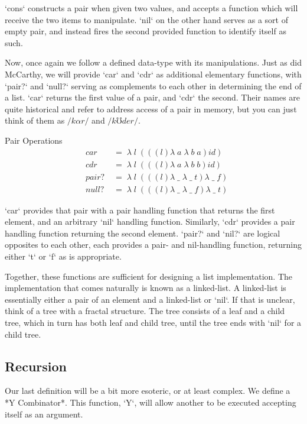 \documentclass[11pt]{article}
\begin{document}
`cons` constructs a pair when given two values, and accepts a function which will receive the two items to manipulate. `nil` on the other hand serves as a sort of empty pair, and instead fires the second provided function to identify itself as such.

Now, once again we follow a defined data-type with its manipulations. Just as did McCarthy, we will provide `car` and `cdr` as additional elementary functions, with `pair?` and `null?` serving as complements to each other in determining the end of a list. `car` returns the first value of a pair, and `cdr` the second. Their names are quite historical and refer to address access of a pair in memory, but you can just think of them as $/k \alpha r/$ and $/k \mho d e r/$.

Pair Operations
\begin{align*}
& car \; &= \; \lambda \; l \; (((l)\lambda \; a \; \lambda \; b \; a)id)
\\& cdr \; &= \; \lambda \; l \; (((l)\lambda \; a \; \lambda \; b \; b)id)
\\& pair? \; &= \; \lambda \; l \; (((l)\lambda \; \_ \; \lambda \; \_ \; t)\lambda \; \_ \; f)
\\& null? \; &= \; \lambda \; l \; (((l)\lambda \; \_ \; \lambda \; \_ \; f)\lambda \; \_ \; t)
\end{align*}

`car` provides that pair with a pair handling function that returns the first element, and an arbitrary `nil` handling function. Similarly, `cdr` provides a pair handling function returning the second element. `pair?` and `nil?` are logical opposites to each other, each provides a pair- and nil-handling function, returning either `t` or `f` as is appropriate.

Together, these functions are sufficient for designing a list implementation. The implementation that comes naturally is known as a linked-list. A linked-list is essentially either a pair of an element and a linked-list or `nil`. If that is unclear, think of a tree with a fractal structure. The tree consists of a leaf and a child tree, which in turn has both leaf and child tree, until the tree ends with `nil` for a child tree.

\subsection{Recursion}
Our last definition will be a bit more esoteric, or at least complex. We define a *Y Combinator*. This function, `Y`, will allow another to be executed accepting itself as an argument.
\end{document}
